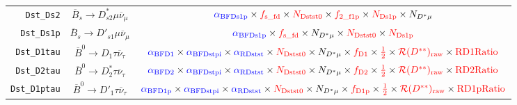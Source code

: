 \begin{landscape}
\begin{table}
\begin{tabular}{r|c|c}
     \texttt{Dst\_Ds2} &           $\overline{B}_s \rightarrow D_{s2}^* \mu \overline{\nu}_\mu$            &                                                                                  $\textcolor{blue}{\alpha_\text{BFDs1p}} \times \textcolor{red}{f_\text{s\_fd}} \times \textcolor{red}{N_\text{Dstst0}} \times \textcolor{red}{f_\text{2\_f1p}} \times \textcolor{red}{N_\text{Ds1p}} \times N_{D^* \mu}$                                                                                  \\
    \texttt{Dst\_Ds1p} &            $\overline{B}_s \rightarrow D'_{s1} \mu \overline{\nu}_\mu$            &                                                                                                      $\textcolor{blue}{\alpha_\text{BFDs1p}} \times \textcolor{red}{f_\text{s\_fd}} \times N_{D^* \mu} \times \textcolor{red}{N_\text{Dstst0}} \times \textcolor{red}{N_\text{Ds1p}}$                                                                                                      \\
   \texttt{Dst\_D1tau} &             $\overline{B}^0 \rightarrow D_1 \tau \overline{\nu}_\tau$             &           $\textcolor{blue}{\alpha_\text{BFD1}} \times \textcolor{blue}{\alpha_\text{BFDstpi}} \times \textcolor{blue}{\alpha_\text{RDstst}} \times \textcolor{red}{N_\text{Dstst0}} \times N_{D^* \mu} \times \textcolor{red}{f_\text{D1}} \times \textcolor{red}{\frac{1}{2}} \times \textcolor{red}{\mathcal{R}(D^{**})_\text{raw}} \times \textcolor{red}{\text{RD1Ratio}}$            \\
   \texttt{Dst\_D2tau} &            $\overline{B}^0 \rightarrow D^*_2 \tau \overline{\nu}_\tau$            &           $\textcolor{blue}{\alpha_\text{BFD2}} \times \textcolor{blue}{\alpha_\text{BFDstpi}} \times \textcolor{blue}{\alpha_\text{RDstst}} \times \textcolor{red}{N_\text{Dstst0}} \times N_{D^* \mu} \times \textcolor{red}{f_\text{D2}} \times \textcolor{red}{\frac{1}{2}} \times \textcolor{red}{\mathcal{R}(D^{**})_\text{raw}} \times \textcolor{red}{\text{RD2Ratio}}$            \\
  \texttt{Dst\_D1ptau} &            $\overline{B}^0 \rightarrow D'_1 \tau \overline{\nu}_\tau$             &          $\textcolor{blue}{\alpha_\text{BFD1p}} \times \textcolor{blue}{\alpha_\text{BFDstpi}} \times \textcolor{blue}{\alpha_\text{RDstst}} \times \textcolor{red}{N_\text{Dstst0}} \times N_{D^* \mu} \times \textcolor{red}{f_\text{D1p}} \times \textcolor{red}{\frac{1}{2}} \times \textcolor{red}{\mathcal{R}(D^{**})_\text{raw}} \times \textcolor{red}{\text{RD1pRatio}}$          \\

\end{tabular}
\end{table}
\end{landscape}
